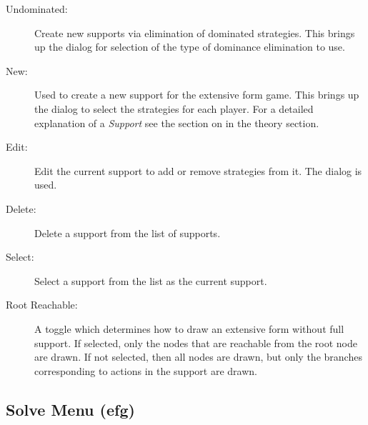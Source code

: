 \begin{description}
\item[Undominated:] Create new supports via elimination of dominated
strategies.  This brings up the  dialog for selection of the type of
dominance elimination to use.
\item[New:] Used to create a new support for the extensive form game.
This brings up the  dialog to select
the strategies for each player.  For a detailed explanation of a {\em
Support} see the section on  in the
theory section.
\item[Edit:] Edit the current support to add or remove strategies from
it. The  dialog is used.  
\item[Delete:] Delete a support from the list of supports.   
\item[Select:] Select a support from the list as the current support.  
\item[Root Reachable:] A toggle which determines how to draw an
extensive form without full support. If selected, only the nodes that
are reachable from the root node are drawn.  If not selected, then all
nodes are drawn, but only the branches corresponding to actions in the
support are drawn.
\end{description}

\subsection{Solve Menu (efg)}\label{efsolve}

